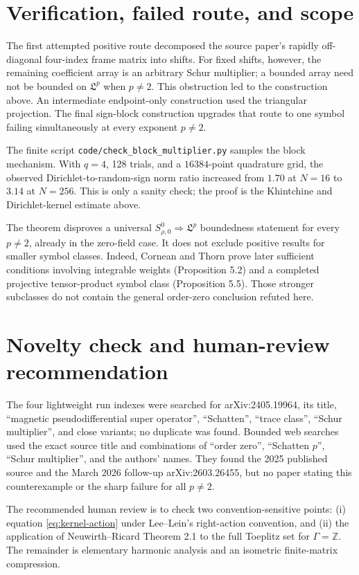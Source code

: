 \documentclass[11pt]{article}
\newcommand{\Z}{\mathbb Z}
\newcommand{\Sp}{\mathfrak L}
\begin{document}
\section*{Verification, failed route, and scope}

The first attempted positive route decomposed the source paper's rapidly
off-diagonal four-index frame matrix into shifts.  For fixed shifts, however,
the remaining coefficient array is an arbitrary Schur multiplier; a bounded
array need not be bounded on $\Sp^p$ when $p\ne2$.  This obstruction led to
the construction above.  An intermediate endpoint-only construction used the
triangular projection.  The final sign-block construction upgrades that route
to one symbol failing simultaneously at every exponent $p\ne2$.

The finite script \texttt{code/check\_block\_multiplier.py} samples the block
mechanism.  With $q=4$, 128 trials, and a $16384$-point quadrature grid, the
observed Dirichlet-to-random-sign norm ratio increased from $1.70$ at $N=16$
to $3.14$ at $N=256$.  This is only a sanity check; the proof is the
Khintchine and Dirichlet-kernel estimate above.

The theorem disproves a universal $S^0_{\rho,0}\Rightarrow\Sp^p$ boundedness
statement for every $p\ne2$, already in the zero-field case.  It does not
exclude positive results for smaller symbol classes.  Indeed, Cornean and
Thorn \cite{CorneanThorn} prove later sufficient conditions involving
integrable weights (Proposition 5.2) and a completed projective tensor-product
symbol class (Proposition 5.5).  Those stronger subclasses do not contain the
general order-zero conclusion refuted here.

\section*{Novelty check and human-review recommendation}

The four lightweight run indexes were searched for arXiv:2405.19964, its title,
``magnetic pseudodifferential super operator'', ``Schatten'', ``trace class'',
``Schur multiplier'', and close variants; no duplicate was found.  Bounded web
searches used the exact source title and combinations of ``order zero'',
``Schatten $p$'', ``Schur multiplier'', and the authors' names.  They found the
2025 published source and the March 2026 follow-up arXiv:2603.26455, but no
paper stating this counterexample or the sharp failure for all $p\ne2$.

The recommended human review is to check two convention-sensitive points:
(i) equation \eqref{eq:kernel-action} under Lee--Lein's right-action convention,
and (ii) the application of Neuwirth--Ricard Theorem 2.1 to the full Toeplitz
set for $\Gamma=\Z$.  The remainder is elementary harmonic analysis and an
isometric finite-matrix compression.
\end{document}

